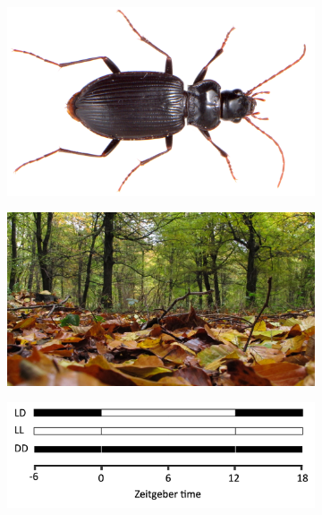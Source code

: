 \begin{figure}[t!]
    \centering
    \begin{subfigure}[t]{0.4\linewidth}
        \caption{}
        \includegraphics[width=\hsize]{src/figures/nebria.jpeg}
        \label{fig:nebria}
    \end{subfigure}
    \begin{subfigure}[t]{0.3\linewidth}
        \caption{}
        \includegraphics[width=\hsize]{src/figures/leaf-litter.jpeg}
        \label{fig:forest}
    \end{subfigure}
    \newline
    \begin{subfigure}[t]{0.3\linewidth}
        \caption{}
        \includegraphics[width=\hsize]{src/figures/light-conditions.png}
        \label{fig:light-conditions}
    \end{subfigure}


\end{figure}
